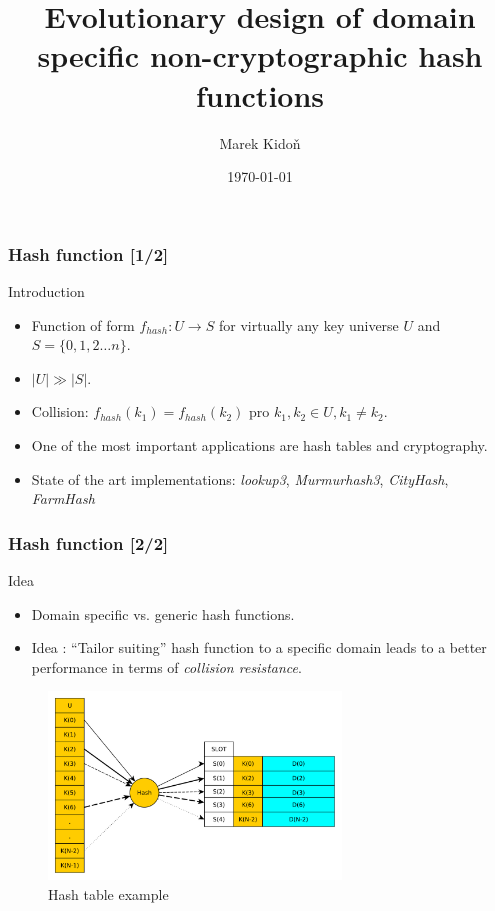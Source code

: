 \documentclass[11pt]{beamer}
\author{Marek Kidoň}
\title{Evolutionary design of domain specific non-cryptographic hash functions}
\subtitle{}
\institute{Brno University of Technology}
\date{\today}
\begin{document}
	\begin{frame}[plain]
		\titlepage
		 \addtocounter{framenumber}{-1}
	\end{frame}
	\begin{frame}
		\frametitle{Hash function [1/2]}
		\begin{block}{Introduction} 
		\begin{itemize}[<+->]
			\item Function of form $f_{hash} : U \to S$ for virtually any  key universe $U$ and $S = \{ 0,1,2 \ldots n \}$.
			\item $|U| \gg |S|$.
			\item Collision: $f_{hash}(k_1) = f_{hash}(k_2)$ pro $k_1, k_2 \in U, k_1 \neq k_2$.
			\item One of the most important applications are hash tables and cryptography.
			\item State of the art implementations: \textit{lookup3}, \textit{Murmurhash3}, \textit{CityHash}, \textit{FarmHash}
		\end{itemize}
		\end{block}
	\end{frame}
	
	\begin{frame}
		\frametitle{Hash function [2/2]}
		\begin{block}{Idea} 
			\begin{itemize}[<+->]
				\item Domain specific vs. generic hash functions. \\
				\item Idea : ``Tailor suiting'' hash function to a specific domain leads to a better performance in terms of
					\textit{collision resistance}. 
			\end{itemize}
		\end{block}
		\begin{figure}
		\centering
		\includegraphics[height=5cm]{fig/hash_table_example}
		\caption{Hash table example}
		\end{figure}
	\end{frame}
	
\end{document}
